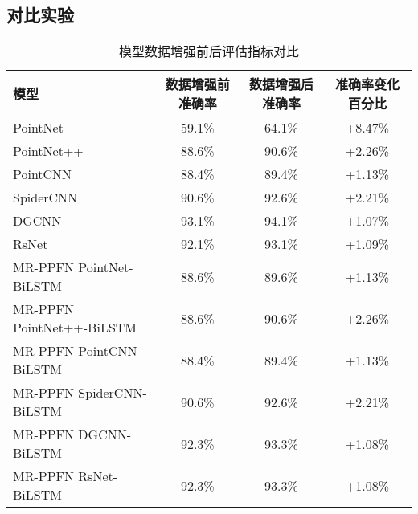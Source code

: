 \subsection{对比实验}
\begin{table}[htbp]
    \centering
    \caption{模型数据增强前后评估指标对比}
    \label{tab:model-comparison}
    \begin{tabular}{lccc}
        \toprule
        \textbf{模型} & \textbf{数据增强前准确率} & \textbf{数据增强后准确率} & \textbf{准确率变化百分比} \\
        \midrule
        PointNet & 59.1\% & 64.1\% & +8.47\% \\
        PointNet++ & 88.6\% & 90.6\% & +2.26\% \\
        PointCNN & 88.4\% & 89.4\% & +1.13\% \\
        SpiderCNN & 90.6\% & 92.6\% & +2.21\% \\
        DGCNN & 93.1\% & 94.1\% & +1.07\% \\
        RsNet & 92.1\% & 93.1\% & +1.09\% \\
        MR-PPFN PointNet-BiLSTM & 88.6\% & 89.6\% & +1.13\% \\
        MR-PPFN PointNet++-BiLSTM & 88.6\% & 90.6\% & +2.26\% \\
        MR-PPFN PointCNN-BiLSTM & 88.4\% & 89.4\% & +1.13\% \\
        MR-PPFN SpiderCNN-BiLSTM & 90.6\% & 92.6\% & +2.21\% \\
        MR-PPFN DGCNN-BiLSTM & 92.3\% & 93.3\% & +1.08\% \\
        MR-PPFN RsNet-BiLSTM & 92.3\% & 93.3\% & +1.08\% \\
        \bottomrule
    \end{tabular}
\end{table}
 


